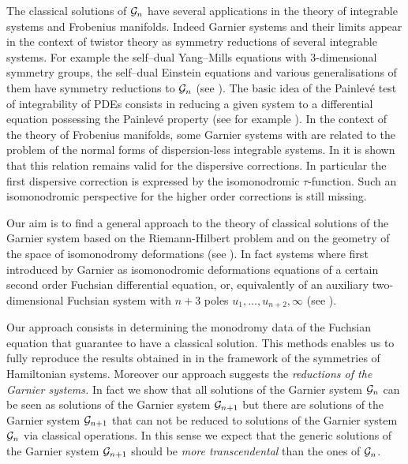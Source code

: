 \documentclass[12pt]{article}
\theoremstyle{definition}
\theoremstyle{theorem}
\begin{document}
The classical solutions of ${\cal G}_n$ have several applications
in the theory of integrable systems and Frobenius manifolds.
Indeed Garnier systems and their limits appear in the context of 
twistor theory as symmetry reductions of several integrable systems.
For example the self--dual Yang--Mills equations with $3$-dimensional 
symmetry groups, the self--dual Einstein equations and various 
generalisations of them have  symmetry reductions to ${\cal G}_n$
(see \cite{MW}). The basic idea of the Painlev\'e test of
integrability of PDEs consists in reducing a given system to a 
differential equation possessing the Painlev\'e property (see for 
example \cite{Con}). In the context of the theory of 
Frobenius manifolds, some Garnier systems with are related to 
the problem of the normal forms of dispersion-less 
integrable systems. In \cite{DZ2} it is shown that this relation remains 
valid for the dispersive corrections. In particular the first dispersive 
correction is expressed by the isomonodromic $\tau$-function. Such an
isomonodromic perspective for the higher order corrections is still
missing. 

Our aim is to find a general approach to the theory of classical 
solutions of the Garnier system based on the Riemann-Hilbert problem 
and on the geometry of the space of isomonodromy deformations (see
\cite{FN, JMU}). 
In fact systems where first introduced by Garnier as isomonodromic
deformations equations of a certain second order Fuchsian differential
equation, or, equivalently of an auxiliary two-dimensional Fuchsian 
system with $n+3$ poles $u_1,\dots,u_{n+2},\infty$ 
(see \cite{Gar1,Gar2,Ok1,IKSY}).

Our approach consists in determining the monodromy data of the
Fuchsian equation that guarantee to have a classical solution. This
methods enables us to fully reproduce the results obtained in \cite{OK} 
in the framework of the symmetries of Hamiltonian systems. Moreover
our approach suggests the {\it reductions of the Garnier systems.}\/ 
In fact we show that all solutions of the Garnier system 
${\cal G}_n$ can be seen as solutions of the Garnier system 
${\cal G}_{n+1}$ but there are solutions of the Garnier system 
${\cal G}_{n+1}$ that can not be reduced to solutions of the Garnier 
system ${\cal G}_{n}$ via classical operations. In this sense we expect 
that the generic solutions of the Garnier system ${\cal G}_{n+1}$ 
should be {\it more transcendental}\/ than the ones of ${\cal G}_n$.
\end{document}
